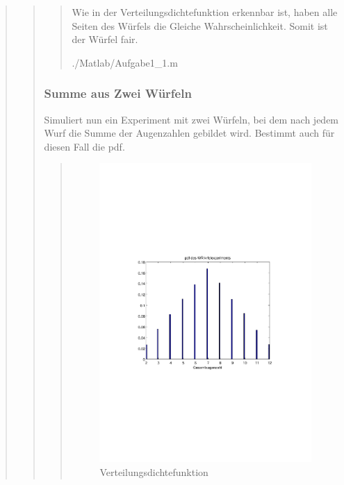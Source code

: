 \begin{quote}
\begin{quote}
\begin{quote}
            Wie in der Verteilungsdichtefunktion erkennbar ist, haben alle Seiten des Würfels die Gleiche Wahrscheinlichkeit.
            Somit ist der Würfel fair.
            
            
                {./Matlab/Aufgabe1_1.m}
                
        \end{quote}
        
        
        \subsubsection{Summe aus Zwei Würfeln}
        Simuliert nun ein Experiment mit zwei Würfeln, bei dem nach jedem Wurf die Summe der Augenzahlen gebildet wird. Bestimmt
        auch für diesen Fall die pdf.
        
        \begin{quote}
            \begin{figure}[H]
            \centering
                \includegraphics[scale=0.7, trim = 20mm 80mm 20mm 90mm, clip]{Bilder/A1_2}
                    \caption{Verteilungsdichtefunktion}
                    \label{fig:A1_2}
            \end{figure}
            

\end{quote}
\end{quote}
\end{quote}

